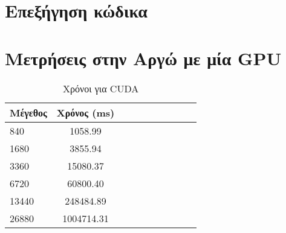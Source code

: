 \section{Επεξήγηση κώδικα}
\section{Μετρήσεις στην Αργώ με μία GPU}


\begin{table}[H]
\centering
\small
\begin{tabular}{| l | c | c | c | c | c | c | c | c | c |}
\hline
Μέγεθος & Χρόνος (\si{\milli\second}) \\
\hline
840 & 1058.99 \\
\hline
1680 & 3855.94 \\
\hline
3360 & 15080.37 \\
\hline
6720 &  60800.40 \\
\hline
13440 & 248484.89 \\
\hline
26880 & 1004714.31 \\
\hline
\end{tabular}
\caption{Χρόνοι για CUDA}
\label{tab:timesCUDA}
\end{table}